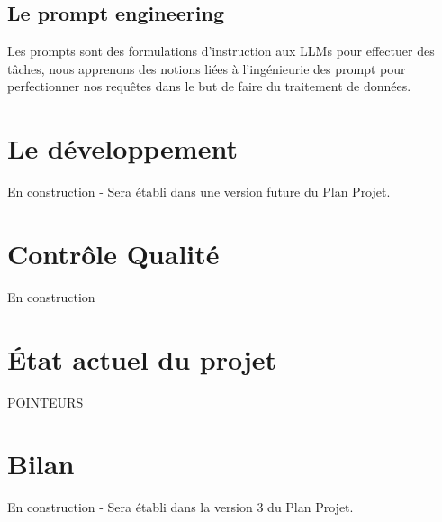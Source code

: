 \documentclass[11pt]{rapport_class}
\begin{document}
\section{Le prompt engineering}
Les prompts sont des formulations d'instruction aux LLMs pour effectuer des tâches, nous apprenons des notions liées à l'ingénieurie des prompt pour perfectionner nos requêtes dans le but de faire du traitement de données.



\chapter{Le développement}
\centerline{En construction - Sera établi dans une version future du Plan Projet.}

\chapter{Contrôle Qualité}
\centerline{En construction}


\chapter{État actuel du projet}
POINTEURS

\chapter{Bilan}
\centerline{En construction - Sera établi dans la version 3 du Plan Projet.}
\end{document}
